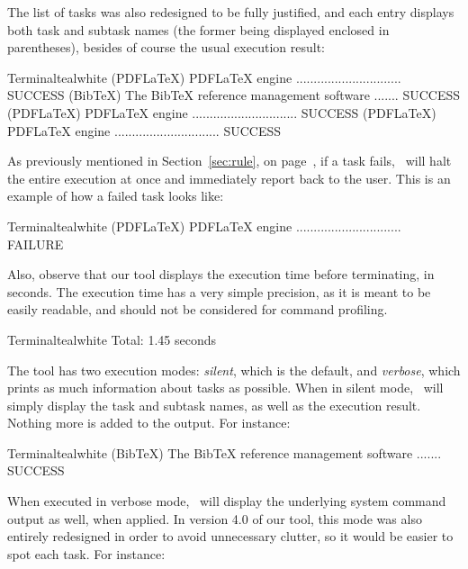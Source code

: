 The list of tasks was also redesigned to be fully justified, and each entry displays both task and subtask names (the former being displayed enclosed in parentheses), besides of course the usual execution result:

\begin{codebox}{Terminal}{teal}{\icnote}{white}
(PDFLaTeX) PDFLaTeX engine .............................. SUCCESS
(BibTeX) The BibTeX reference management software ....... SUCCESS
(PDFLaTeX) PDFLaTeX engine .............................. SUCCESS
(PDFLaTeX) PDFLaTeX engine .............................. SUCCESS
\end{codebox}

As previously mentioned in Section~\ref{sec:rule}, on page~\pageref{sec:rule}, if a task fails, \arara\ will halt the entire execution at once and immediately report back to the user. This is an example of how a failed task looks like:

\begin{codebox}{Terminal}{teal}{\icnote}{white}
(PDFLaTeX) PDFLaTeX engine .............................. FAILURE
\end{codebox}

Also, observe that our tool displays the execution time before terminating, in seconds. The execution time has a very simple precision, as it is meant to be easily readable, and should not be considered for command profiling.

\begin{codebox}{Terminal}{teal}{\icnote}{white}
Total: 1.45 seconds
\end{codebox}

The tool has two execution modes: \emph{silent}, which is the default, and \emph{verbose}, which prints as much information about tasks as possible. When in silent mode, \arara\ will simply display the task and subtask names, as well as the execution result. Nothing more is added to the output. For instance:

\begin{codebox}{Terminal}{teal}{\icnote}{white}
(BibTeX) The BibTeX reference management software ....... SUCCESS
\end{codebox}

When executed in verbose mode, \arara\ will display the underlying system command output as well, when applied. In version 4.0 of our tool, this mode was also entirely redesigned in order to avoid unnecessary clutter, so it would be easier to spot each task. For instance:

